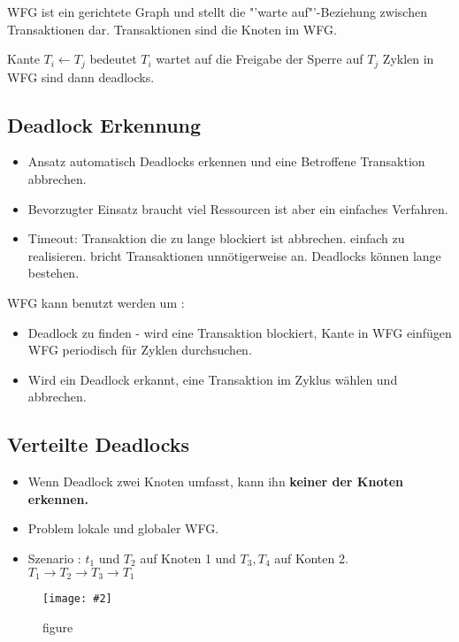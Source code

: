 \documentclass[a4paper,10pt,titlepage=false]{scrreprt}
\newcommand{\pic}[2][figure]{\begin{figure}[h]
 \centering
 \texttt{[image: \#2]}
 \caption{#1}
\end{figure}
}
\begin{document}
 WFG ist ein gerichtete Graph und stellt die "'warte auf"'-Beziehung zwischen Transaktionen dar. Transaktionen sind die Knoten im WFG.\\
 \begin{framed}
   Kante $T_i \leftarrow T_j$ bedeutet $T_i$ wartet auf die Freigabe der Sperre auf $T_j$ Zyklen in WFG sind dann deadlocks.  
 \end{framed}

\subsection{Deadlock Erkennung} %
\label{sub:deadlock_erkennung}
\begin{itemize}
  \item Ansatz automatisch Deadlocks erkennen und eine Betroffene Transaktion abbrechen.
  \item Bevorzugter Einsatz braucht viel Ressourcen ist aber ein einfaches Verfahren.
  \item Timeout: Transaktion die zu lange blockiert ist abbrechen.
  \subitem einfach zu realisieren. 
  \subitem bricht Transaktionen unnötigerweise an.
  \subitem Deadlocks können lange bestehen.
\end{itemize}
WFG kann benutzt werden um :
\begin{itemize}
  \item Deadlock zu finden -
  \subitem  wird eine Transaktion blockiert, Kante in WFG einfügen 
  \subitem WFG periodisch für Zyklen durchsuchen.
  \item Wird ein Deadlock erkannt, eine Transaktion im Zyklus wählen und abbrechen.
\end{itemize}

\subsection{Verteilte Deadlocks} %
\label{sub:verteilte_deadlocks}
\begin{itemize}
  \item Wenn Deadlock zwei Knoten umfasst, kann ihn \textbf{keiner der Knoten erkennen.}
  \item Problem lokale und globaler WFG.
  \item Szenario : $t_1 $ und $T_2$ auf Knoten 1 und $T_3,T_4$ auf Konten 2. $T_1 \rightarrow T_2 \rightarrow T_3 \rightarrow T_1 $
\end{itemize}
\pic{wfg.png}
\end{document}
